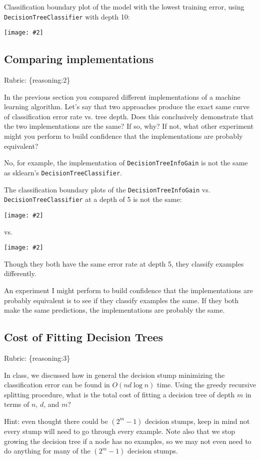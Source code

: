 \documentclass{article}
\def\rubric#1{\gre{Rubric: \{#1\}}}{}
\def\blu#1{{\color{blu}#1}}
\def\gre#1{{\color{gre}#1}}
\newcommand{\centerfig}[2]{\begin{center}\texttt{[image: \#2]}\end{center}}
\begin{document}
\gre{Classification boundary plot of the model with the lowest training error, using \texttt{DecisionTreeClassifier} with depth 10:}

\centerfig{0.7}{../figs/q6_5_lowestTrainingError}

\subsection{Comparing implementations}
\rubric{reasoning:2}

In the previous section you compared different implementations of a machine learning algorithm. Let's say that two
approaches produce the exact same curve of classification error rate vs. tree depth. Does this conclusively demonstrate
that the two implementations are the same? If so, why? If not, what other experiment might you perform to build confidence
that the implementations are probably equivalent?

\gre{No, for example, the implementation of \texttt{DecisionTreeInfoGain} is not the same as sklearn's \texttt{DecisionTreeClassifier}.}

\gre{The classification boundary plots of the \texttt{DecisionTreeInfoGain} vs. \texttt{DecisionTreeClassifier} at a depth of 5 is not the same:}
\centerfig{0.7}{../figs/q6_6_infoGain}
\gre{vs.}
\centerfig{0.7}{../figs/q6_6_classifier}

\gre{Though they both have the same error rate at depth 5, they classify examples differently.}

\gre{An experiment I might perform to build confidence that the implementations are probably equivalent is to see if they classify examples the same. If they both make the same predictions, the implementations are probably the same.}

\subsection{Cost of Fitting Decision Trees}
\rubric{reasoning:3}

In class, we discussed how in general the decision stump minimizing the classification error can be found in $O(nd\log n)$ time.
Using the greedy recursive splitting procedure, \blu{what is the total cost of fitting a decision tree of depth $m$ in terms of $n$, $d$, and $m$?}

Hint: even thought there could be $(2^m-1)$ decision stumps, keep in mind not every stump will need to go through every example. Note also that we stop growing the decision tree if a node has no examples, so we may not even need to do anything for many of the $(2^m-1)$ decision stumps.
\end{document}
